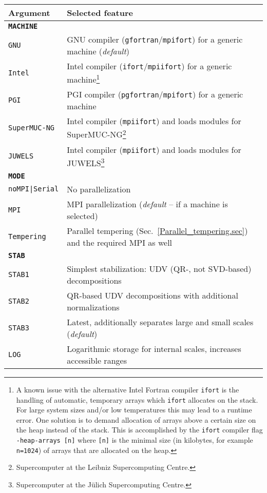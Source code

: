 \begin{table}[!ht]
	\begin{center}
		\begin{tabular}{@{} p{} p{} @{}}\toprule %
			Argument & Selected feature \\\midrule
			\textbf{\texttt{MACHINE}} &  \\\midrule
			\texttt{GNU}  &   GNU compiler (\texttt{gfortran}/\texttt{mpifort}) for a generic machine (\emph{default}) \\
			\texttt{Intel}  &   Intel compiler (\texttt{ifort}/\texttt{mpiifort}) for a generic machine\footnote{A known issue with the alternative Intel Fortran compiler \texttt{ifort} is the handling of automatic, temporary arrays 
				which \texttt{ifort} allocates on the stack. For large system sizes and/or low temperatures this may lead to a runtime error. One solution is to demand allocation of arrays above a certain size on the heap instead of the stack. This is accomplished by the \texttt{ifort} compiler flag \texttt{-heap-arrays [n]} where \texttt{[n]} is the minimal size (in kilobytes, for example \texttt{n=1024}) of arrays that are allocated on the heap.} \\
			\texttt{PGI}  &   PGI compiler (\texttt{pgfortran}/\texttt{mpifort}) for a generic machine \\
			\texttt{SuperMUC-NG}  &  Intel compiler (\texttt{mpiifort}) and loads modules for SuperMUC-NG\footnote{Supercomputer at the Leibniz Supercomputing Centre.} \\
			\texttt{JUWELS}  &  Intel compiler (\texttt{mpiifort}) and loads modules for JUWELS\footnote{Supercomputer at the J\"ulich Supercomputing Centre.}
			\vspace{7pt}\\
			
			\textbf{\texttt{MODE}} &  \\\midrule
			\texttt{noMPI|Serial}  &  No parallelization \\
			\texttt{MPI}  &  MPI parallelization (\emph{default} -- if a machine is selected) \\
			\texttt{Tempering}  &  Parallel tempering (Sec.~\ref{Parallel_tempering.sec}) and the required MPI as well
			\vspace{7pt}\\ 
			
			\textbf{\texttt{STAB}} &  \\\midrule
			\texttt{STAB1}  &  Simplest stabilization: UDV (QR-, not SVD-based) decompositions\\
			\texttt{STAB2}  &  QR-based UDV decompositions with additional normalizations\\
			\texttt{STAB3}  &  Latest, additionally separates large and small scales (\emph{default})\\
			\texttt{LOG}  &  Logarithmic storage for internal scales, increases accessible ranges
			\vspace{7pt}\\
			

\end{tabular}
\end{center}
\end{table}
